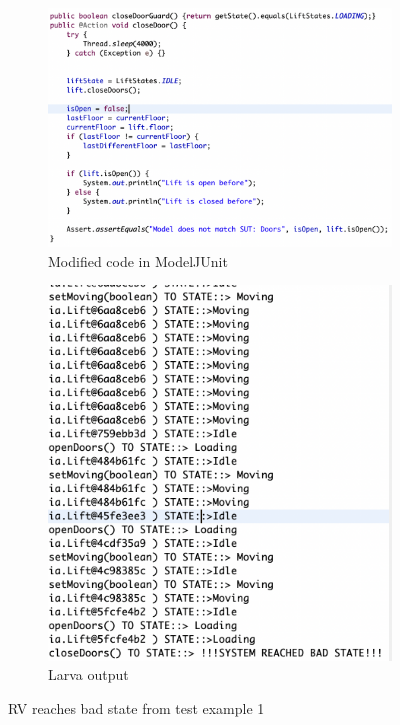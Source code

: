 \documentclass[a4paper, 12pt]{article}
\begin{document}
\begin{figure}
\centering
\begin{subfigure}{.5\textwidth}
  \centering
  \includegraphics[width=\linewidth]{images/larva-test-fail-code}
  \caption{Modified code in ModelJUnit}
\end{subfigure}%
\begin{subfigure}{.5\textwidth}
  \centering
  \includegraphics[width=\linewidth]{images/larva-test-fail-output}
  \caption{Larva output}
\end{subfigure}
\caption{RV reaches bad state from test example 1}
\label{fig:larva-test-fail}
\end{figure}
\end{document}
